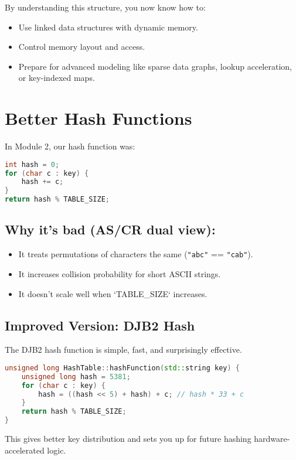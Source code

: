 \documentclass{article}
\begin{document}
By understanding this structure, you now know how to:
\begin{itemize}
    \item Use linked data structures with dynamic memory.
    \item Control memory layout and access.
    \item Prepare for advanced modeling like sparse data graphs, lookup acceleration, or key-indexed maps.
\end{itemize}

\section*{Better Hash Functions}

In Module 2, our hash function was:

\begin{lstlisting}[language=C++]
int hash = 0;
for (char c : key) {
    hash += c;
}
return hash % TABLE_SIZE;
\end{lstlisting}

\subsection*{Why it’s bad (AS/CR dual view):}
\begin{itemize}
    \item It treats permutations of characters the same (\texttt{"abc"} == \texttt{"cab"}).
    \item It increases collision probability for short ASCII strings.
    \item It doesn't scale well when `TABLE\_SIZE` increases.
\end{itemize}

\subsection*{Improved Version: DJB2 Hash}

The DJB2 hash function is simple, fast, and surprisingly effective.

\begin{lstlisting}[language=C++]
unsigned long HashTable::hashFunction(std::string key) {
    unsigned long hash = 5381;
    for (char c : key) {
        hash = ((hash << 5) + hash) + c; // hash * 33 + c
    }
    return hash % TABLE_SIZE;
}
\end{lstlisting}

This gives better key distribution and sets you up for future hashing hardware-accelerated logic.
\end{document}
